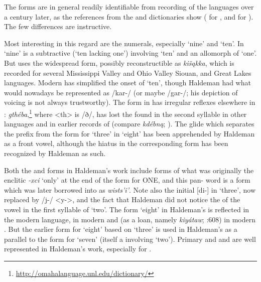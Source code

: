 \documentclass[output=paper]{LSP/langsci}
\begin{document}
The forms are in general readily identifiable from recording of the languages over a century later, as the references from the  and  dictionaries show (\citealt{CumberlandRankin2012} for , and \citealt{Quintero2009} for ). The few differences are instructive.    

 
Most interesting in this regard are the numerals, especially `nine' and `ten'.  In  `nine' is a subtractive  (`ten lacking one') involving `ten' and an allomorph of `one'.  But   uses the widespread form, possibly reconstructible as \textit{ki\v{s}\k{a}kka}, which is recorded for several Mississippi Valley and Ohio Valley Siouan,  and Great Lakes  languages.   Modern  has simplified the onset of `ten', though Haldeman had what would nowadays be represented as /kar-/ (or maybe /gar-/; his depiction of voicing is not always trustworthy).  The form in  has irregular reflexes elsewhere in :    \textit{gthéba},\footnote{\url{http://omahalanguage.unl.edu/dictionary/}} where <th> is /ð/, has lost the  found in the second syllable in other  languages and in earlier records of  (compare  \textit{kdébn\k{a}}; \citealt[3]{Rankin1982}). The glide which separates the prefix from the form for `three' in  `eight' has been apprehended by Haldeman as a front vowel, although the hiatus in the corresponding  form has been recognized by Haldeman as such.  

Both the  and  forms in Haldeman's work include forms of what was originally the enclitic \textit{-xci} `only' at the end of the form for ONE, and this pan- word is a form which was later borrowed into  as \textit{wists'i'}.  Note also the initial [di-] in  `three', now replaced by /j-/ <y->, and the fact that Haldeman did not notice the  of the vowel in the first syllable of  `two'.  The form `eight' in Haldeman's  is reflected in the modern language, in modern  and (as a loan, namely \textit{kiy\'ataw}; \citealt{Rood1996}:608) in modern . But the earlier form for `eight' based on `three' is used in Haldeman's  as a parallel to the form for `seven' (itself a  involving `two'). Primary  and  and  are well represented in Haldeman's work, especially for .  
 
\end{document}
